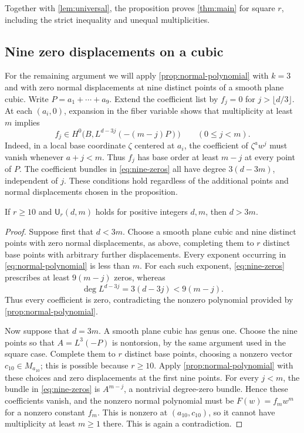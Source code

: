 Together with \cref{lem:universal}, the proposition proves \cref{thm:main} for square $r$, including the strict inequality and unequal multiplicities.

\subsection{Nine zero displacements on a cubic}

For the remaining argument we will apply \cref{prop:normal-polynomial} with $k=3$ and with zero normal displacements at nine distinct points of a smooth plane cubic. Write $P=a_1+\cdots+a_9$.  Extend the coefficient list by $f_j=0$ for $j>\lfloor d/3\rfloor$.  At each $(a_i,0)$, expansion in the fiber variable shows that multiplicity at least $m$ implies
\begin{equation}
\label{eq:nine-zeros}
 f_j\in H^0\bigl(B,L^{d-3j}(-(m-j)P)\bigr)
 \qquad(0\le j<m).
\end{equation}
Indeed, in a local base coordinate $\zeta$ centered at $a_i$, the coefficient of $\zeta^a w^j$ must vanish whenever $a+j<m$. Thus $f_j$ has base order at least $m-j$ at every point of $P$. The coefficient bundles in \eqref{eq:nine-zeros} all have degree $3(d-3m)$, independent of $j$.  These conditions hold regardless of the additional points and normal displacements chosen in the proposition.

\begin{lemma}
\label{lem:cubic-low-degree}
If $r\ge10$ and $\mathsf U_r(d,m)$ holds for positive integers $d,m$, then $d>3m$.
\end{lemma}

\begin{proof}
Suppose first that $d<3m$.  Choose a smooth plane cubic and nine distinct points with zero normal displacements, as above, completing them to $r$ distinct base points with arbitrary further displacements. Every exponent occurring in \eqref{eq:normal-polynomial} is less than $m$.  For each such exponent, \eqref{eq:nine-zeros} prescribes at least $9(m-j)$ zeros, whereas
\[
 \deg L^{d-3j}=3(d-3j)<9(m-j).
\]
Thus every coefficient is zero, contradicting the nonzero polynomial provided by \cref{prop:normal-polynomial}.

Now suppose that $d=3m$.  A smooth plane cubic has genus one.  Choose the nine points so that $A=L^3(-P)$ is nontorsion, by the same argument used in the square case.  Complete them to $r$ distinct base points, choosing a nonzero vector $c_{10}\in M_{a_{10}}$; this is possible because $r\ge10$.  Apply \cref{prop:normal-polynomial} with these choices and zero displacements at the first nine points. For every $j<m$, the bundle in \eqref{eq:nine-zeros} is $A^{m-j}$, a nontrivial degree-zero bundle. Hence these coefficients vanish, and the nonzero normal polynomial must be $F(w)=f_mw^m$ for a nonzero constant $f_m$.  This is nonzero at $(a_{10},c_{10})$, so it cannot have multiplicity at least $m\ge1$ there.  This is again a contradiction.
\end{proof}
